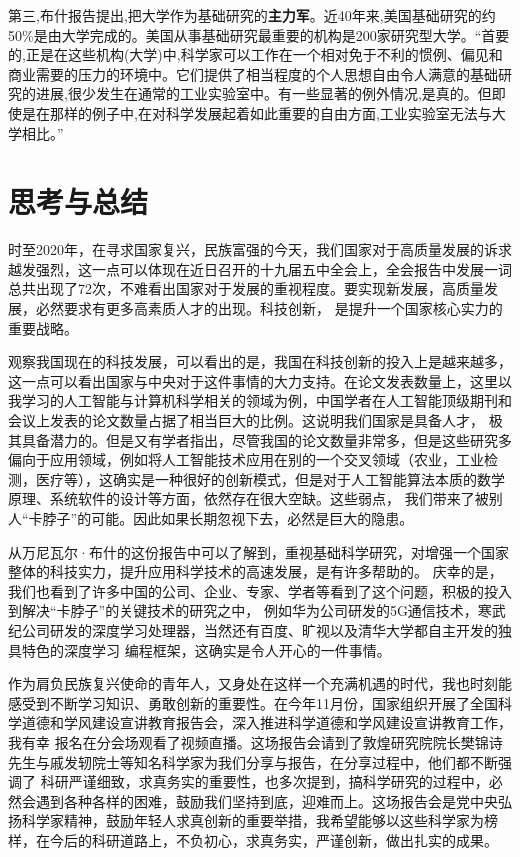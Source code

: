 第三,布什报告提出,把大学作为基础研究的\textbf{主力军}。近40年来,美国基础研究的约50\%是由大学完成的。美国从事基础研究最重要的机构是200家研究型大学。“首要的,正是在这些机构(大学)中,科学家可以工作在一个相对免于不利的惯例、偏见和商业需要的压力的环境中。它们提供了相当程度的个人思想自由令人满意的基础研究的进展,很少发生在通常的工业实验室中。有一些显著的例外情况,是真的。但即使是在那样的例子中,在对科学发展起着如此重要的自由方面,工业实验室无法与大学相比。”

\section{思考与总结}

时至2020年，在寻求国家复兴，民族富强的今天，我们国家对于高质量发展的诉求越发强烈，这一点可以体现在近日召开的十九届五中全会上，全会报告中发展一词总共出现了72次，不难看出国家对于发展的重视程度。要实现新发展，高质量发展，必然要求有更多高素质人才的出现。科技创新，
是提升一个国家核心实力的重要战略。

观察我国现在的科技发展，可以看出的是，我国在科技创新的投入上是越来越多，这一点可以看出国家与中央对于这件事情的大力支持。在论文发表数量上，这里以我学习的人工智能与计算机科学相关的领域为例，中国学者在人工智能顶级期刊和会议上发表的论文数量占据了相当巨大的比例。这说明我们国家是具备人才，
极其具备潜力的。但是又有学者指出，尽管我国的论文数量非常多，但是这些研究多偏向于应用领域，例如将人工智能技术应用在别的一个交叉领域（农业，工业检测，医疗等），这确实是一种很好的创新模式，但是对于人工智能算法本质的数学原理、系统软件的设计等方面，依然存在很大空缺。这些弱点，
我们带来了被别人“卡脖子”的可能。因此如果长期忽视下去，必然是巨大的隐患。

从万尼瓦尔·布什的这份报告中可以了解到，重视基础科学研究，对增强一个国家整体的科技实力，提升应用科学技术的高速发展，是有许多帮助的。
庆幸的是，我们也看到了许多中国的公司、企业、专家、学者等看到了这个问题，积极的投入到解决“卡脖子”的关键技术的研究之中，
例如华为公司研发的5G通信技术，寒武纪公司研发的深度学习处理器\cite{ref4}，当然还有百度\cite{ref5}、旷视以及清华大学\cite{ref6}都自主开发的独具特色的深度学习
编程框架，这确实是令人开心的一件事情。

作为肩负民族复兴使命的青年人，又身处在这样一个充满机遇的时代，我也时刻能感受到不断学习知识、勇敢创新的重要性。在今年11月份，国家组织开展了全国科学道德和学风建设宣讲教育报告会，深入推进科学道德和学风建设宣讲教育工作，我有幸
报名在分会场观看了视频直播。这场报告会请到了敦煌研究院院长樊锦诗先生与戚发轫院士等知名科学家为我们分享与报告，在分享过程中，他们都不断强调了
科研严谨细致，求真务实的重要性，也多次提到，搞科学研究的过程中，必然会遇到各种各样的困难，鼓励我们坚持到底，迎难而上。这场报告会是党中央弘扬科学家精神，鼓励年轻人求真创新的重要举措，我希望能够以这些科学家为榜样，在今后的科研道路上，不负初心，求真务实，严谨创新，做出扎实的成果。

